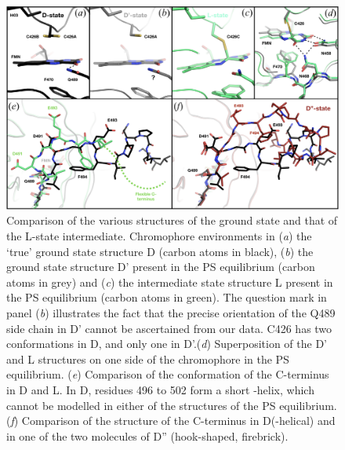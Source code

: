 \begin{figure}[H] %
    \centering
    \noindent \includegraphics[width=\textwidth]{images/LOV2/LOV2slow_Fig3.pdf}
    \hfill
    \caption{Comparison of the various structures of the ground state and that of the L-state intermediate. Chromophore environments in (\textit{a}) the ‘true’ ground state structure D (carbon atoms in black), (\textit{b}) the ground state structure D' present in the PS equilibrium (carbon atoms in grey) and (\textit{c}) the intermediate state structure L present in the PS equilibrium (carbon atoms in green). The question mark in panel (\textit{b}) illustrates the fact that the precise orientation of the Q489 side chain in D' cannot be ascertained from our data. C426 has two conformations in D, and only one in D'.(\textit{d}) Superposition of the D' and L structures on one side of the chromophore in the PS equilibrium. (\textit{e}) Comparison of the conformation of the C-terminus in D and L. In D, residues 496 to 502 form a short \textalpha-helix, which cannot be modelled in either of the structures of the PS equilibrium. (\textit{f}) Comparison of the structure of the C-terminus in D(\textalpha-helical) and in one of the two molecules of D'' (hook-shaped, firebrick).}
    \label{fig:LOV2slowdiffstates}
\end{figure}

